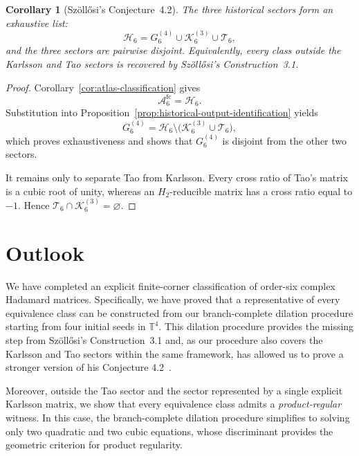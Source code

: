 \documentclass[aps,prx,reprint,nofootinbib,twoside,superscriptaddress,longbibliography,floatfix]{revtex4-2}
\newtheorem{corollary}[theorem]{Corollary}
\theoremstyle{definition}
\newcommand{\HH}{\mathcal H}
\newcommand{\KK}{\mathcal K}
\newcommand{\FCAtlas}{\mathcal A}
\begin{document}
\begin{corollary}[Sz\"oll\H{o}si's Conjecture~4.2]
\label{cor:szollosi-conjecture}
The three historical sectors form an exhaustive list:
\begin{equation}
\HH_6
=
G_6^{(4)}\cup\KK_6^{(3)}\cup\mathcal T_6,
\label{eq:szollosi-conjecture-list}
\end{equation}
and the three sectors are pairwise disjoint. Equivalently, every
class outside the Karlsson and Tao sectors is recovered by
Sz\"oll\H{o}si's Construction~3.1.
\end{corollary}

\begin{proof}
Corollary~\ref{cor:atlas-classification} gives
\[
\FCAtlas_6^{\mathrm{fc}}=\HH_6.
\]
Substitution into
Proposition~\ref{prop:historical-output-identification} yields
\[
G_6^{(4)}
=
\HH_6\setminus
\bigl(\KK_6^{(3)}\cup\mathcal T_6\bigr),
\]
which proves exhaustiveness and shows that $G_6^{(4)}$ is disjoint
from the other two sectors.

It remains only to separate Tao from Karlsson. Every cross ratio of
Tao's matrix is a cubic root of unity, whereas an $H_2$-reducible
matrix has a cross ratio equal to $-1$. Hence
$\mathcal T_6\cap\KK_6^{(3)}=\varnothing$.
\end{proof}

\section{Outlook}
\label{sec:outlook}
We have completed an explicit finite-corner classification of order-six complex Hadamard matrices. Specifically, we have proved that a representative of every equivalence class can be constructed from our branch-complete dilation procedure starting from four initial seeds in $\mathbb{T}^4$. This dilation procedure provides the missing step from Sz\"oll\H{o}si's Construction~3.1 and, as our procedure also covers the Karlsson and Tao sectors within the same framework, has allowed us to prove a stronger version of his Conjecture 4.2~\cite{Szollosi2012FourParameter}. 

Moreover, outside the Tao sector and the sector represented by a single explicit Karlsson matrix, we show that every equivalence class admits a \textit{product-regular} witness. In this case, the branch-complete dilation procedure simplifies to solving only two quadratic and two cubic equations, whose discriminant provides the geometric criterion for product regularity.
\end{document}
